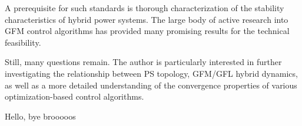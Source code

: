 \documentclass[journal]{IEEEtran}
\begin{document}
A prerequisite for such standards is thorough characterization
of the stability characteristics of hybrid power systems. The
large body of active research into GFM control algorithms
has provided many promising results for the technical feasibility.

Still, many questions remain. The author is particularly interested
in further investigating the relationship between PS topology, GFM/GFL
hybrid dynamics, as well as a more detailed understanding of the
convergence properties of various optimization-based control algorithms.


Hello, bye brooooos

\ifCLASSOPTIONcaptionsoff
  \newpage
\fi







%





\end{document}
